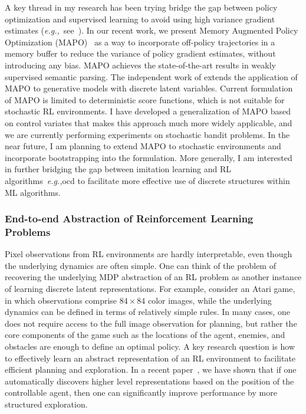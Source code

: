 \documentclass[a4paper, 10pt]{article}
\def\eg{{\em e.g.,}}
\begin{document}
A key thread in my research has been trying bridge the gap between
policy optimization and supervised learning to avoid using high
variance gradient estimates
(\eg~see~\cite{raml,pqt2018,ocd,dvn,mapo}).  In our recent work, we
present Memory Augmented Policy Optimization (MAPO)~\cite{mapo} as a
way to incorporate off-policy trajectories in a memory buffer to
reduce the variance of policy gradient estimates, without introducing
any bias. MAPO achieves the state-of-the-art results in weakly
supervised semantic parsing. The independent work of \cite{liu2018rao}
extends the application of MAPO to generative models with discrete
latent variables. Current formulation of MAPO is limited to
deterministic score functions, which is not suitable for stochastic RL
environments. I have developed a generalization of MAPO based on
control variates that makes this approach much more widely applicable,
and we are currently performing experiments on stochastic bandit
problems. In the near future, I am planning to extend MAPO to
stochastic environments and incorporate bootstrapping into the
formulation. More generally, I am interested in further bridging the
gap between imitation learning and RL algorithms~\eg{ocd} to
facilitate more effective use of discrete structures within ML algorithms.

\vspace*{-.2cm}
\subsubsection*{End-to-end Abstraction of Reinforcement Learning Problems}

\hspace{\parindent} Pixel observations from RL environments are hardly
interpretable, even though the underlying dynamics are often
simple. One can think of the problem of recovering the underlying MDP
abstraction of an RL problem as another instance of learning discrete
latent representations. For example, consider an Atari game, in which
observations comprise $84\!\times\!84$ color images, while the
underlying dynamics can be defined in terms of relatively simple
rules. In many cases, one does not require access to the full image
observation for planning, but rather the core components of the game
such as the locations of the agent, enemies, and obstacles are enough
to define an optimal policy. A key research question is how to
effectively learn an abstract representation of an RL environment to
facilitate efficient planning and exploration. In a recent
paper~\cite{coex}, we have shown that if one automatically discovers
higher level representations based on the position of the controllable
agent, then one can significantly improve performance by more
structured exploration.
\end{document}
